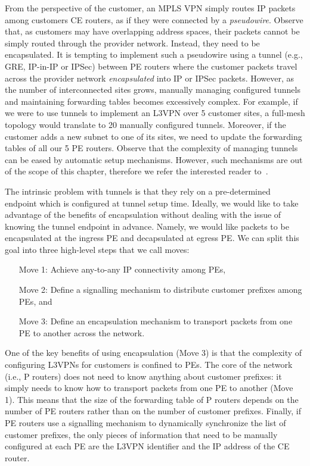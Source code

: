 \documentclass{article}
\begin{document}
From the perspective of the customer, an MPLS VPN 
simply routes IP packets among customers CE routers, as if they were connected by a \emph{pseudowire}.
Observe that, as customers may have overlapping address spaces, their packets cannot be simply routed through the provider network. Instead, they need to be encapsulated.  
It is tempting to implement such a pseudowire using a tunnel (e.g., GRE, IP-in-IP or IPSec) 
between PE routers where the customer packets travel across the provider network 
\emph{encapsulated} into IP or IPSec packets. However, as the number of 
interconnected sites grows, manually managing configured tunnels and maintaining 
forwarding tables becomes excessively complex. For example, if we were to use 
tunnels to implement an L3VPN over 5 customer sites, a full-mesh topology would 
translate to 20 manually configured tunnels. Moreover, if the customer adds a 
new subnet to one of its sites, we need to update the forwarding tables of all 
our 5 PE routers. Observe that the complexity
of managing tunnels can be eased by automatic setup mechanisms. However, such 
mechanisms are out of the scope of this chapter, therefore we refer the 
interested reader to~\cite{rfc4023,rfc5512,cisco-preso}.

The intrinsic problem with tunnels is that they rely on a pre-determined 
endpoint which is configured at tunnel setup time. Ideally, we would like to 
take advantage of the benefits of encapsulation without dealing with the 
issue of knowing the tunnel endpoint in advance. Namely, we would like packets 
to be encapsulated at the ingress PE and decapsulated at egress PE. We can 
split this goal into three high-level steps that we call moves:

\begin{enumerate}
\item[Move 1:] Achieve any-to-any IP connectivity among PEs,
\item[Move 2:] Define a signalling mechanism to distribute customer prefixes among PEs, 
and
\item[Move 3:] Define an encapsulation mechanism to transport packets from one 
PE 
to another across the network.
\end{enumerate}

One of the key benefits of using encapsulation (Move 3) is that the complexity 
of configuring L3VPNs for customers is confined to PEs. The core of the network 
(i.e., P routers) does not need to know anything about customer prefixes: it 
simply needs to know how to transport packets from one PE to another (Move 1). 
This means that the size of the forwarding table of P routers depends on the 
number of PE routers rather than on the number of customer prefixes. Finally, if PE 
routers use a signalling mechanism to dynamically synchronize the list of 
customer prefixes, the only pieces of information that need to be manually 
configured at each PE are the L3VPN identifier and the IP address of the CE 
router.
\end{document}
